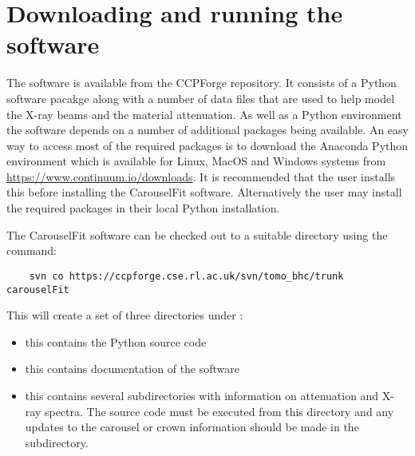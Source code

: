 \documentclass{article}
\begin{document}
\section{Downloading and running the software}

The software is available from the CCPForge repository.
It consists of a Python software pacakge along with a number of data files that are used to help model the X-ray
beams and the material attenuation.
As well as a Python environment the software depends on a number of additional packages being available.
An easy way to access most of the required packages is to download the Anaconda Python environment which is
available for Linux, MacOS and Windows systems from \url{https://www.continuum.io/downloads}.
It is recommended that the user installs this before installing the CarouselFit software.
Alternatively the user may install the required packages in their local Python installation.

The CarouselFit software can be checked out to a suitable directory using the command:
\begin{verbatim}
    svn co https://ccpforge.cse.rl.ac.uk/svn/tomo_bhc/trunk carouselFit
\end{verbatim}
This will create a set of three directories under :
\begin{itemize}
\item {} this contains the Python source code
\item {} this contains documentation of the software
\item {} this contains several subdirectories with information on attenuation and X-ray spectra.
The source code must be executed from this directory and any updates to the carousel or crown information
should be made in the  subdirectory.
\end{itemize}
\end{document}
